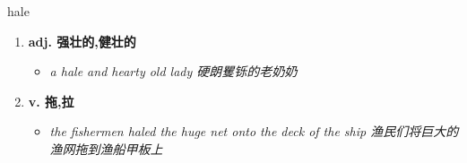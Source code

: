 
\begin{frame}
{\huge hale}
\begin{center}
\begin{enumerate}\Large
  \item \textbf{adj. 强壮的,健壮的}
  \begin{itemize}
    \item \em{\Large{a hale and hearty old lady 硬朗矍铄的老奶奶}}
  \end{itemize}
  \item \textbf{v. 拖,拉}
  \begin{itemize}
    \item \em{\Large{the fishermen haled the huge net onto the deck of the ship 渔民们将巨大的渔网拖到渔船甲板上}}
  \end{itemize}
\end{enumerate}
\end{center}
\end{frame}
